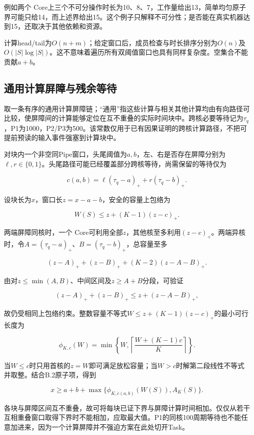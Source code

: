 \documentclass[anonymous,notoc]{gmcm2026}
\begin{document}
例如两个 Core上三个不可分操作时长为10、8、7，工作量给出13，简单均匀原子界可能只给14，而上述界给出15。这个例子只解释不可分性；是否能在真实机器达到15，还取决于其他依赖和资源。

计算head/tail为\(O(n+m)\)；给定窗口后，成员检查与时长排序分别为\(O(n)\)及\(O(|S|\log|S|)\)。这不意味着遍历所有双阈值窗口也具有同样复杂度。空集合不能贡献\(a+b\)。

\subsection{通用计算屏障与残余等待}\label{ux901aux7528ux8ba1ux7b97ux5c4fux969cux4e0eux6b8bux4f59ux7b49ux5f85}

取一条有序的通用计算屏障链；``通用''指这些计算与相关其他计算均由有向路径可比较，使屏障间的计算能够定位在互不重叠的实际时间块中。跨核必要等待记为\(\tau_q\)，P1为1000，P2/P3为500。该常数仅用于已有因果证明的跨核计算路径，不把可提前预读的输入事件强塞到计算块中。

对块内一个非空同Pipe窗口，头尾阈值为\(a,b\)，左、右是否存在屏障分别为\(\ell,r\in\{0,1\}\)。头尾路径可能已经覆盖部分跨核等待，尚需保留的等待仅为

\[c(a,b)=\ell(\tau_q-a)_++r(\tau_q-b)_+.\]

设块长为\(x\)，窗口长\(z=x-a-b\)，安全的容量上包络为

\[W(S)\le z+(K-1)(z-c)_+.\]

两端屏障同核时，一个 Core可利用全部\(z\)，其他核至多利用\((z-c)_+\)。两端异核时，令\(A=(\tau_q-a)_+\)、\(B=(\tau_q-b)_+\)，总容量至多

\[ (z-A)_++(z-B)_++(K-2)(z-A-B)_+.\]

由对\(z\le\min(A,B)\)、中间区间及\(z\ge A+B\)分段，可验证

\[(z-A)_++(z-B)_+\le z+(z-A-B)_+,\]

故仍受相同上包络约束。整数容量不等式\(W\le z+(K-1)(z-c)_+\)的最小可行长度为

\[\phi_{K,c}(W)=\min\left\{W,\left\lceil\frac{W+(K-1)c}{K}\right\rceil\right\}.\]

当\(W\le c\)时只用首核的\(z=W\)即可满足放松容量；当\(W>c\)时解第二段线性不等式并取整。结合B.2原子项，得到

\[x\ge a+b+\max\{\phi_{K,c(a,b)}(W(S)),A_K(S)\}.\]

各块与屏障区间互不重叠，故可将每块已证下界与屏障计算时间相加。仅仅从若干互相重叠窗口取得下界时不能相加，应取最大值。P1的同核100周期等待也不能任意加进来，因为一个计算屏障并不强迫方案在此处切开Task。
\end{document}
